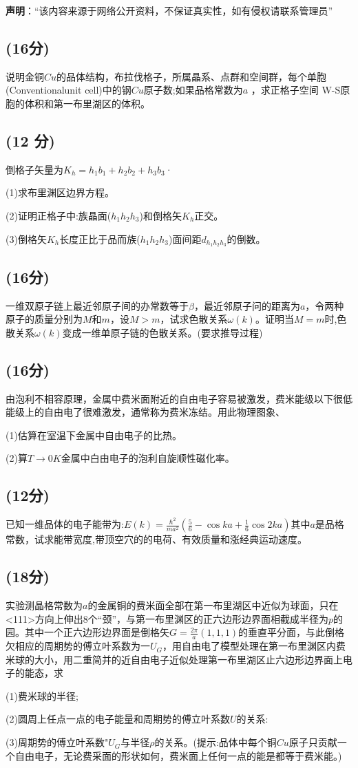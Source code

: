 
\textbf{声明}：“该内容来源于网络公开资料，不保证真实性，如有侵权请联系管理员”

\subsection{(16分)}
说明金铜$Cu$的品体结构，布拉伐格子，所属晶系、点群和空间群，每个单胞(Conventionalunit cell)中的钢$Cu$原子数;如果品格常数为$a$ ，求正格子空间 W-S原胞的体积和第一布里湖区的体积。
\subsection{(12 分)}
倒格子矢量为$K_h=h_1b_1+h_2b_2+h_3b_3$·

(1)求布里渊区边界方程。

(2)证明正格子中:族晶面($h_1h_2h_3$)和倒格矢$K_h$正交。

(3)倒格矢$K_h$长度正比于品而族($h_1h_2h_3$)面间距$d_{h_1h_2h_3}$的倒数。
\subsection{(16分)}
一维双原子链上最近邻原子间的办常数等于$\beta$，最近邻原子问的距离为$a$，令两种原子的质量分别为$M$和$m$，设$M>m$，试求色散关系$\omega(k)$。证明当$M=m$时,色散关系$\omega(k)$变成一维单原子链的色散关系。(要求推导过程)
\subsection{(16分)}
由泡利不相容原理，金属中费米面附近的自由电子容易被激发，费米能级以下很低能级上的自由电了很难激发，通常称为费米冻结。用此物理图象、

(1)估算在室温下金属中自由电子的比热。

(2)算$T\to0K$金属中白由电子的泡利自旋顺性磁化率。
\subsection{(12分)}
已知一维品体的电子能带为:$E(k) = \frac{\hbar^2}{ma^2} \left( \frac{5}{6} - \cos ka + \frac{1}{6} \cos 2ka \right)$其中$a$是品格常数，试求能带宽度,带顶空穴的的电荷、有效质量和涨经典运动速度。
\subsection{(18分)}
实验测晶格常数为$a$的金属铜的费米面全部在第一布里湖区中近似为球面，只在<111>方向上伸出8个“颈”，与第一布里渊区的正六边形边界面相截成半径为$p$的园。其中一个正六边形边界面是倒格矢$G=\frac{2\pi}{a}(1,1,1)$的垂直平分面，与此倒格欠相应的周期势的傅立叶系数为一$U_G$，用自由电了模型处理在第一布里渊区内费米球的大小，用二重简并的近自由电子近似处理第一布里湖区止六边形边界面上电子的能态，求

(1)费米球的半径;

(2)圆周上任点一点的电子能量和周期势的傅立叶系数$U$的关系:

(3)周期势的傅立叶系数"$U_G$与半径$\rho $的关系。(提示:品体中每个铜$Cu$原子只贡献一个自由电子，无论费采面的形状如何，费米面上任何一点的能是都等于费米能。)